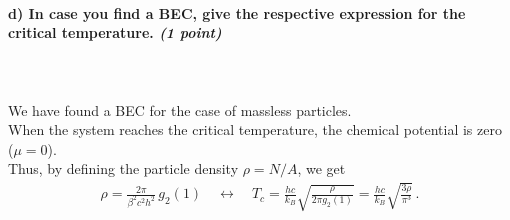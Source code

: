\paragraph{d) In case you find a BEC, give the respective expression for the critical temperature.
    \textit{(1 point)}
} \ \\
\\
We have found a BEC for the case of massless particles. \\
When the system reaches the critical temperature, the chemical potential is zero ($\mu=0$). \\
Thus, by defining the particle density $\rho = N/A$, we get
\begin{align}
	\rho = \frac{2\pi}{\beta^2 c^2 h^2} \, g_2(1) \quad \longleftrightarrow \quad
	T_c = \frac{hc}{k_B} \sqrt{\frac{\rho}{2\pi g_2(1)}} = \frac{hc}{k_B} \sqrt{\frac{3\rho}{\pi^3}} \,.
\end{align}